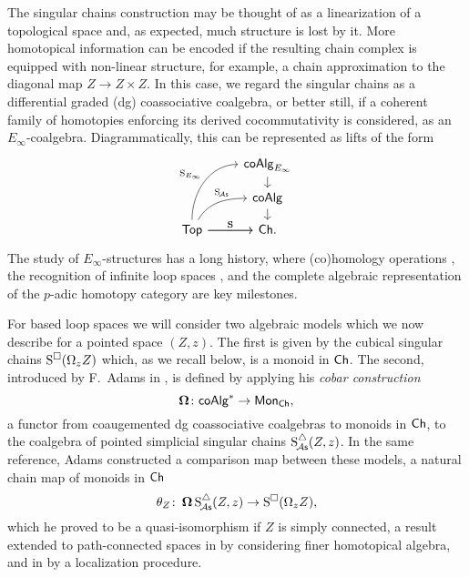 The singular chains construction may be thought of as a linearization of a topological space and, as expected, much structure is lost by it.
More homotopical information can be encoded if the resulting chain complex is equipped with non-linear structure, for example, a chain approximation to the diagonal map $Z \to Z \times Z$.
In this case, we regard the singular chains as a differential graded (dg) coassociative coalgebra, or better still, if a coherent family of homotopies enforcing its derived cocommutativity is considered, as an $E_\infty$-coalgebra.
Diagrammatically, this can be represented as lifts of the form
\begin{equation}
\begin{tikzcd}[column sep=normal, row sep=small]
& \coAlg_{E_\infty} \arrow[d] \\
& \coAlg \arrow[d] \\
\Top \arrow[uur, "\Schains_{E_\infty}", out=90, in=180] \arrow[r, "\Schains"]
\arrow[ur, "\SchainsAS", out=60, in=180, near end]
\arrow[r, "\Schains"]
& \Ch.
\end{tikzcd}
\end{equation}
The study of $E_\infty$-structures has a long history, where (co)homology operations \cite{steenrod1962cohomology, may1970general}, the recognition of infinite loop spaces \cite{boardman1973homotopy, may1972geometry}, and the complete algebraic representation of the $p$-adic homotopy category \cite{mandell2001padic} are key milestones.

For based loop spaces we will consider two algebraic models which we now describe for a pointed space $(Z, z)$.
The first is given by the cubical singular chains $\operatorname{S^{\square}}(\Omega_z Z)$ which, as we recall below, is a monoid in $\mathsf{Ch}$.
The second, introduced by F.~Adams in \cite{adams1956cobar}, is defined by applying his \textit{cobar construction}
\[
\operatorname{\mathbf{\Omega}} \colon \mathsf{coAlg}^\ast \to \mathsf{Mon}_{\mathsf{Ch}},
\]
a functor from coaugemented dg coassociative coalgebras to monoids in $\mathsf{Ch}$, to the coalgebra of pointed simplicial singular chains $\operatorname{S^{\triangle}_{\!{\mathcal{A}\mathsf{s}}}}(Z,z)$.
In the same reference, Adams constructed a comparison map between these models, a natural chain map of monoids in $\mathsf{Ch}$
\begin{equation} \label{e:adams map}
\theta_Z \colon \operatorname{\mathbf{\Omega}} \operatorname{S^{\triangle}_{\!{\mathcal{A}\mathsf{s}}}}(Z,z) \to \operatorname{S^{\square}}(\Omega_z Z),
\end{equation}
which he proved to be a quasi-isomorphism if $Z$ is simply connected, a result extended to path-connected spaces in \cite{rivera2018cubical} by considering finer homotopical algebra, and in \cite{hess2010cobar} by a localization procedure.

